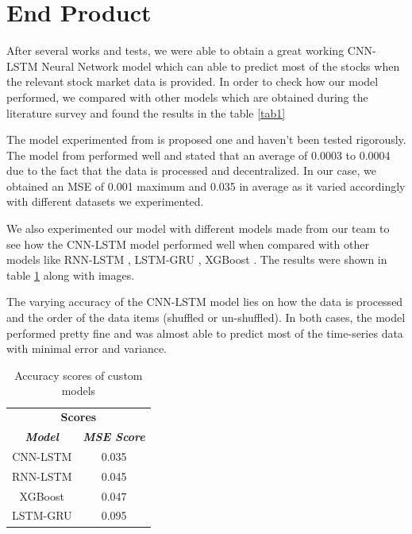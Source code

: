 \documentclass[conference]{IEEEtran}
\begin{document}
\FloatBarrier
\section{End Product}

After several works and tests, we were able to obtain a great working CNN-LSTM Neural Network model which can able to predict most of the stocks when the relevant stock market data is provided. In order to check how our model performed, we compared with other models which are obtained during the literature survey and found the results in the table \ref{tab1}

The model experimented from \cite{b3} is proposed one and haven't been tested rigorously. The model from \cite{b9} performed well and stated that an average of 0.0003 to 0.0004 due to the fact that the data is processed and decentralized. In our case, we obtained an MSE of 0.001 maximum and 0.035 in average as it varied accordingly with different datasets we experimented.

We also experimented our model with different models made from our team to see how the CNN-LSTM model performed well when compared with other models like RNN-LSTM \cite{b25}, LSTM-GRU \cite{b26}, XGBoost \cite{b27}. The results were shown in table \ref{tab2} along with images.

The varying accuracy of the CNN-LSTM model lies on how the data is processed and the order of the data items (shuffled or un-shuffled). In both cases, the model performed pretty fine and was almost able to predict most of the time-series data with minimal error and variance.

\begin{table}[htbp]
	\caption{Accuracy scores of custom models}
	\begin{center}
		\begin{tabular}{|c|c|}
			\hline
			\multicolumn{2}{|c|}{\textbf{Scores}} \\
			\cline{1-2} 
			\textbf{\textit{Model}}& \textbf{\textit{MSE Score}} \\
			\hline
			CNN-LSTM & 0.035 \\
			\hline
			RNN-LSTM \cite{b25} & 0.045 \\
			\hline
			XGBoost \cite{b27} & 0.047 \\
			\hline
			LSTM-GRU \cite{b26} & 0.095 \\
			\hline
		\end{tabular}
		\label{tab2}
	\end{center}
\end{table}
\end{document}
